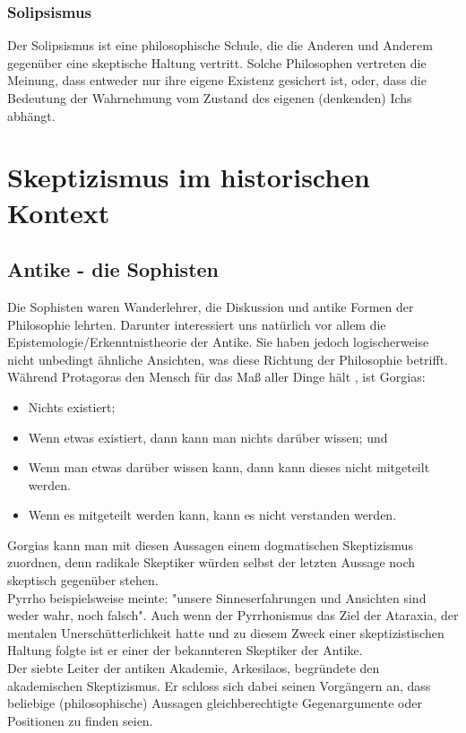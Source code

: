 \documentclass[12pt,a4paper]{article}
\begin{document}
		\subsubsection{Solipsismus}
Der Solipsismus ist eine philosophische Schule, die die Anderen und Anderem gegenüber eine skeptische Haltung vertritt. Solche Philosophen vertreten die Meinung, dass entweder nur ihre eigene Existenz gesichert ist, oder, dass die Bedeutung der Wahrnehmung vom Zustand des eigenen (denkenden) Ichs abhängt.%
\section{Skeptizismus im historischen Kontext}
	\subsection{Antike - die Sophisten}
Die Sophisten waren Wanderlehrer, die Diskussion und antike Formen der Philosophie lehrten. Darunter interessiert uns %
natürlich vor allem die Epistemologie/Erkenntnistheorie der Antike. Sie haben jedoch logischerweise nicht unbedingt ähnliche Ansichten, was diese Richtung der Philosophie betrifft. Während Protagoras den Mensch für das Maß aller Dinge hält%
, ist Gorgias:
\begin{itemize}
\item Nichts existiert;
\item Wenn etwas existiert, dann kann man nichts darüber wissen; und
\item Wenn man etwas darüber wissen kann, dann kann dieses nicht mitgeteilt werden.
\item Wenn es mitgeteilt werden kann, kann es nicht verstanden werden.
\end{itemize}%
Gorgias kann man mit diesen Aussagen einem dogmatischen Skeptizismus zuordnen, denn radikale Skeptiker würden selbst der letzten Aussage noch skeptisch gegenüber stehen.\\
Pyrrho beispielsweise meinte: "unsere Sinneserfahrungen und Ansichten sind weder wahr, noch falsch".%
 Auch wenn der Pyrrhonismus das Ziel der Ataraxia, der mentalen Unerschütterlichkeit hatte und zu diesem Zweck einer skeptizistischen Haltung folgte ist er einer der bekannteren Skeptiker der Antike.%
\\Der siebte Leiter der antiken Akademie, Arkesilaos, begründete den akademischen Skeptizismus. Er schloss sich dabei seinen Vorgängern an, dass beliebige (philosophische) Aussagen gleichberechtigte Gegenargumente oder Positionen zu finden seien.
\end{document}
